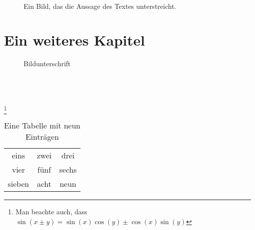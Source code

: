 
\blinddocument
{}

\begin{figure}[h]
  \centering
  \caption{Ein Bild, das die Aussage des Textes unterstreicht.}
  \label{statement}
\end{figure}


\chapter{Ein weiteres Kapitel}


\begin{figure}[h]
	\centering
	\caption{Bildunterschrift}
	\label{introduction}
\end{figure}

\blindtext\\
\blindtext\\
\blindtext\\
\blindtext\footnote{Man beachte auch, dass $\sin(x\pm y) = \sin(x)\cos(y) \pm \cos(x)\sin(y)$}

\begin{table}[h]
  \centering
  \begin{tabular}{ccc}
  \toprule
  eins & zwei & drei\\
  vier & fünf & sechs\\
  sieben & acht & neun\\
  \bottomrule
  \end{tabular}
  \caption{Eine Tabelle mit neun Einträgen}
  \label{TabNeunEinträge} %
\end{table}
